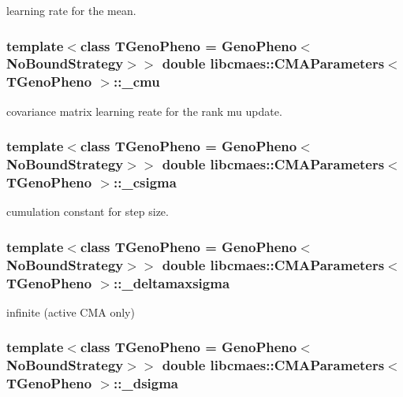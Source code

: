 learning rate for the mean. \hypertarget{classlibcmaes_1_1CMAParameters_a0d4da3faa7fba9eb555d7dbfee7a6402}{
\subsubsection[{\-\_\-cmu}]{\setlength{\rightskip}{0pt plus 5cm}template$<$class T\-Geno\-Pheno = Geno\-Pheno$<$\-No\-Bound\-Strategy$>$$>$ double {\bf libcmaes\-::\-C\-M\-A\-Parameters}$<$ T\-Geno\-Pheno $>$\-::\-\_\-cmu}}\label{classlibcmaes_1_1CMAParameters_a0d4da3faa7fba9eb555d7dbfee7a6402}
covariance matrix learning reate for the rank mu update. \hypertarget{classlibcmaes_1_1CMAParameters_a9fc0879daeaeeb882192feddb0efecfc}{
\subsubsection[{\-\_\-csigma}]{\setlength{\rightskip}{0pt plus 5cm}template$<$class T\-Geno\-Pheno = Geno\-Pheno$<$\-No\-Bound\-Strategy$>$$>$ double {\bf libcmaes\-::\-C\-M\-A\-Parameters}$<$ T\-Geno\-Pheno $>$\-::\-\_\-csigma}}\label{classlibcmaes_1_1CMAParameters_a9fc0879daeaeeb882192feddb0efecfc}
cumulation constant for step size. \hypertarget{classlibcmaes_1_1CMAParameters_a011a9f790bc21c6bea155066a26f5181}{
\subsubsection[{\-\_\-deltamaxsigma}]{\setlength{\rightskip}{0pt plus 5cm}template$<$class T\-Geno\-Pheno = Geno\-Pheno$<$\-No\-Bound\-Strategy$>$$>$ double {\bf libcmaes\-::\-C\-M\-A\-Parameters}$<$ T\-Geno\-Pheno $>$\-::\-\_\-deltamaxsigma}}\label{classlibcmaes_1_1CMAParameters_a011a9f790bc21c6bea155066a26f5181}
infinite (active C\-M\-A only) \hypertarget{classlibcmaes_1_1CMAParameters_a87f2b165fab84e65672361e5d6ac7f3d}{
\subsubsection[{\-\_\-dsigma}]{\setlength{\rightskip}{0pt plus 5cm}template$<$class T\-Geno\-Pheno = Geno\-Pheno$<$\-No\-Bound\-Strategy$>$$>$ double {\bf libcmaes\-::\-C\-M\-A\-Parameters}$<$ T\-Geno\-Pheno $>$\-::\-\_\-dsigma}}\label{classlibcmaes_1_1CMAParameters_a87f2b165fab84e65672361e5d6ac7f3d}
